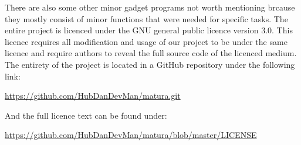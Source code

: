 There are also some other minor gadget programs not worth mentioning brcause they mostly consist of minor functions 
that were needed for specific tasks. The entire project is licenced under the GNU general public licence version 
3.0. This licence requires all modification and usage of our project to be under the same licence and 
require authors to reveal the full source code of the licenced medium. The entirety of the project is located
in a GitHub repository under the following link:

\url{https://github.com/HubDanDevMan/matura.git}

And the full licence text can be found under:

\url{https://github.com/HubDanDevMan/matura/blob/master/LICENSE}
